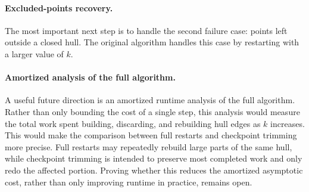 \documentclass[a4paper,twoside]{article}
\begin{document}
\paragraph{Excluded-points recovery.} The most important next step is to handle the second failure case: points left outside a closed hull. The original algorithm handles this case by restarting with a larger value of \(k\).


\paragraph{Amortized analysis of the full algorithm.} A useful future direction is an amortized runtime analysis of the full algorithm. Rather than only bounding the cost of a single step, this analysis would measure the total work spent building, discarding, and rebuilding hull edges as \(k\) increases. This would make the comparison between full restarts and checkpoint trimming more precise. Full restarts may repeatedly rebuild large parts of the same hull, while checkpoint trimming is intended to preserve most completed work and only redo the affected portion. Proving whether this reduces the amortized asymptotic cost, rather than only improving runtime in practice, remains open.

\end{document}
